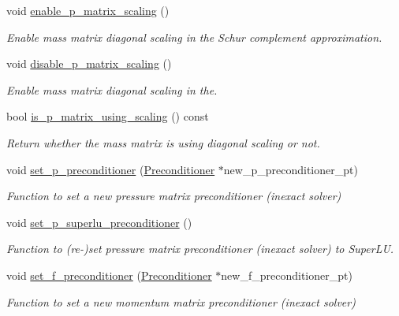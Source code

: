 \begin{DoxyCompactItemize}
\item 
void \hyperlink{classoomph_1_1PressureBasedSolidLSCPreconditioner_aeb7e9109194f8a468a2c6ffec13e3c9f}{enable\+\_\+p\+\_\+matrix\+\_\+scaling} ()
\begin{DoxyCompactList}\small\item\em Enable mass matrix diagonal scaling in the Schur complement approximation. \end{DoxyCompactList}\item 
void \hyperlink{classoomph_1_1PressureBasedSolidLSCPreconditioner_aa1b8a157c96f347dcb5f23b14c88765f}{disable\+\_\+p\+\_\+matrix\+\_\+scaling} ()
\begin{DoxyCompactList}\small\item\em Enable mass matrix diagonal scaling in the. \end{DoxyCompactList}\item 
bool \hyperlink{classoomph_1_1PressureBasedSolidLSCPreconditioner_abefd3cc7c97fbdaad40c0231663c680f}{is\+\_\+p\+\_\+matrix\+\_\+using\+\_\+scaling} () const
\begin{DoxyCompactList}\small\item\em Return whether the mass matrix is using diagonal scaling or not. \end{DoxyCompactList}\item 
void \hyperlink{classoomph_1_1PressureBasedSolidLSCPreconditioner_a921f36ec8af49017b799a3832d7f688f}{set\+\_\+p\+\_\+preconditioner} (\hyperlink{classoomph_1_1Preconditioner}{Preconditioner} $\ast$new\+\_\+p\+\_\+preconditioner\+\_\+pt)
\begin{DoxyCompactList}\small\item\em Function to set a new pressure matrix preconditioner (inexact solver) \end{DoxyCompactList}\item 
void \hyperlink{classoomph_1_1PressureBasedSolidLSCPreconditioner_ae138780720a5c540f13ecf793cc753bd}{set\+\_\+p\+\_\+superlu\+\_\+preconditioner} ()
\begin{DoxyCompactList}\small\item\em Function to (re-\/)set pressure matrix preconditioner (inexact solver) to Super\+LU. \end{DoxyCompactList}\item 
void \hyperlink{classoomph_1_1PressureBasedSolidLSCPreconditioner_ac62a1112a99ae9503b97bd1c26f086f2}{set\+\_\+f\+\_\+preconditioner} (\hyperlink{classoomph_1_1Preconditioner}{Preconditioner} $\ast$new\+\_\+f\+\_\+preconditioner\+\_\+pt)
\begin{DoxyCompactList}\small\item\em Function to set a new momentum matrix preconditioner (inexact solver) \end{DoxyCompactList}\item 

\end{DoxyCompactItemize}
